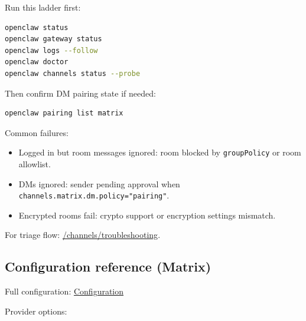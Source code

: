 Run this ladder first:

\begin{lstlisting}[language=bash]
openclaw status
openclaw gateway status
openclaw logs --follow
openclaw doctor
openclaw channels status --probe
\end{lstlisting}


Then confirm DM pairing state if needed:

\begin{lstlisting}[language=bash]
openclaw pairing list matrix
\end{lstlisting}


Common failures:

\begin{itemize}
  \item Logged in but room messages ignored: room blocked by \texttt{groupPolicy} or room allowlist.
  \item DMs ignored: sender pending approval when \texttt{channels.matrix.dm.policy="pairing"}.
  \item Encrypted rooms fail: crypto support or encryption settings mismatch.
\end{itemize}


For triage flow: \href{/channels/troubleshooting}{/channels/troubleshooting}.

\subsection{Configuration reference (Matrix)}


Full configuration: \href{/gateway/configuration}{Configuration}

Provider options:

